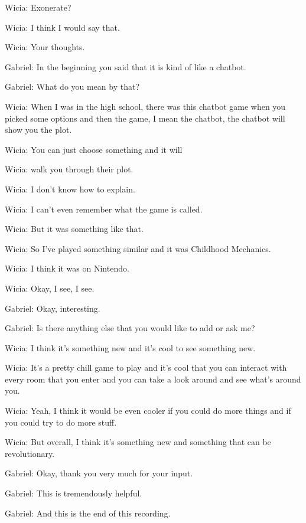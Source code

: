 Wicia: Exonerate?

Wicia: I think I would say that.

Wicia: Your thoughts.

Gabriel: In the beginning you said that it is kind of like a chatbot.

Gabriel: What do you mean by that?

Wicia: When I was in the high school, there was this chatbot game when you picked some options and then the game, I mean the chatbot, the chatbot will show you the plot.

Wicia: You can just choose something and it will

Wicia: walk you through their plot.

Wicia: I don't know how to explain.

Wicia: I can't even remember what the game is called.

Wicia: But it was something like that.

Wicia: So I've played something similar and it was Childhood Mechanics.

Wicia: I think it was on Nintendo.

Wicia: Okay, I see, I see.

Gabriel: Okay, interesting.

Gabriel: Is there anything else that you would like to add or ask me?

Wicia: I think it's something new and it's cool to see something new.

Wicia: It's a pretty chill game to play and it's cool that you can interact with every room that you enter and you can take a look around and see what's around you.

Wicia: Yeah, I think it would be even cooler if you could do more things and if you could try to do more stuff.

Wicia: But overall, I think it's something new and something that can be revolutionary.

Gabriel: Okay, thank you very much for your input.

Gabriel: This is tremendously helpful.

Gabriel: And this is the end of this recording.

